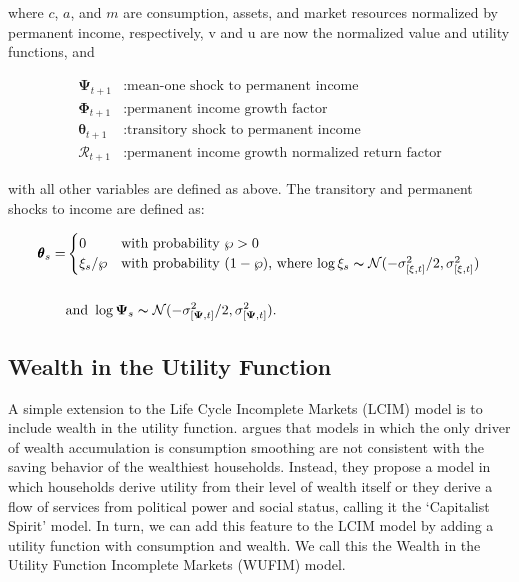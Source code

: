 \documentclass{article}
\newcommand{\uFunc}{\mathrm{u}}
\newcommand{\vFunc}{\mathrm{v}}
\newcommand{\PermGroFac}{\pmb{\Phi}}
\newcommand{\PermShk}{\mathbf{\Psi}}
\newcommand{\aNrm}{a}
\newcommand{\cNrm}{c}
\newcommand{\RNrm}{\mathcal{R}}
\newcommand{\TranShkEmp}{\pmb{\theta}}
\newcommand{\mNrm}{m}
\newcommand{\pZero}{\wp}
\begin{document}
where $\cNrm$, $\aNrm$, and $\mNrm$ are consumption, assets, and market resources normalized by permanent income, respectively, $\vFunc$ and $\uFunc$ are now the normalized value and utility functions,  and

\begin{equation}
\begin{align}
  \PermShk_{t+1} & :  \text{mean-one shock to permanent income}
    \\ \PermGroFac_{t+1} & :  \text{permanent income growth factor}
    \\ \TranShkEmp_{t+1} & :  \text{transitory shock to permanent income}
    \\ \RNrm_{t+1} & :  \text{permanent income growth normalized return factor}
\end{align}
\end{equation}

with all other variables are defined as above. The transitory and permanent shocks to income are defined as:

\begin{equation}
\begin{align}
\TranShkEmp_{s}  = &
    \begin{cases}
        0\phantom{/\pZero} & \text{with probability $\pZero>0$}
        \\ \xi_{s}/\pZero & \text{with probability $(1-\pZero)$, where
            $\log \xi_{s}\thicksim \mathcal{N}(-\sigma_{[\xi, t]}^{2}/2,\sigma_{[\xi, t]}^{2})$}
    \end{cases}
    \\ \phantom{/\pZero} \\ & \text{and }  \log \PermShk_{s}   \thicksim \mathcal{N}(-\sigma_{[\PermShk, t]}^{2}/2,\sigma_{[\PermShk, t]}^{2}).
  \end{align}
\end{equation}

\subsection{Wealth in the Utility Function}\label{Wealth in the Utility Function}

A simple extension to the Life Cycle Incomplete Markets (LCIM) model is to include wealth in the utility function. \cite{Carroll_1998} argues that models in which the only driver of wealth accumulation is consumption smoothing are not consistent with the saving behavior of the wealthiest households. Instead, they propose a model in which households derive utility from their level of wealth itself or they derive a flow of services from political power and social status, calling it the `Capitalist Spirit' model. In turn, we can add this feature to the LCIM model by adding a utility function with consumption and wealth. We call this the Wealth in the Utility Function Incomplete Markets (WUFIM) model.
\end{document}
